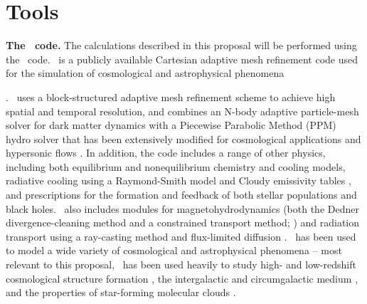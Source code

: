 \vspace{-4mm}
\section{Tools}
\label{sec:codes}
\vspace{-3mm}

 

\noindent
{\large \textbf{The \enzo\ code.}}
The calculations described in this proposal will be performed using
the \enzo\ code.  \enzo\ is a publicly available Cartesian adaptive
mesh 
refinement code used for the simulation of cosmological and
astrophysical phenomena

\cite[][\url{http://enzo-project.org}]{2014ApJS..211...19B}.  \enzo\
uses a block-structured adaptive mesh refinement scheme 
\cite{Berger89} to achieve high spatial and temporal resolution, and
combines an N-body adaptive particle-mesh solver for dark matter
dynamics with a Piecewise Parabolic Method (PPM) hydro solver that has
been extensively 
modified for cosmological applications and hypersonic
flows \cite{Bryan95}.  In addition, the code includes a range of other
physics, including both equilibrium and nonequilibrium chemistry and
cooling models, radiative cooling using a Raymond-Smith model and
Cloudy emissivity tables \cite{2008MNRAS.385.1443S}, and prescriptions
for the formation and feedback of both stellar populations and black
holes.  \enzo\ also includes modules for magnetohydrodynamics (both
the Dedner divergence-cleaning method and a constrained transport
method; \cite{Wang:2009a,Wang:2010,Collins10}) and radiation transport
using a ray-casting method and flux-limited diffusion \cite{Wise11,
Reynolds09}.  \enzo\ has been used to model a wide variety of
cosmological and astrophysical phenomena -- most relevant to this
proposal, \enzo\ has been used heavily to study high- and
low-redshift cosmological structure formation \cite{Abel02, Turk09,
2007ApJ...654...66O, 2012MNRAS.427..311W, 2008MNRAS.385.1443S,
2012ApJ...749..140H, 2014ApJ...791...64E, 2013MNRAS.432.1989S}, the
intergalactic and circumgalactic medium
\cite{2007ApJ...671...27H,2011ApJ...731....6S,2013MNRAS.430.1548H,2012ApJ...759..137J},
and the properties of star-forming molecular clouds
\cite{Kritsuk11,Kritsuk11b,Collins11,Collins11b,Collins12,Schmidt13}.

